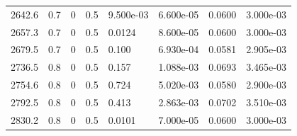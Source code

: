 \documentclass[preview]{standalone}
\begin{document}
{{{\begin{tabular}{L{1.2cm}C{1.2cm} C{0.3cm}C{0.5cm} C{1.4cm}C{1.4cm} C{1.4cm}C{1.4cm}}
  2642.6  &   0.7  & 0     & 0.5 &  9.500e-03  & 6.600e-05  & 0.0600 &  3.000e-03   \\ 
  2657.3  &   0.7  & 0     & 0.5 &  0.0124  & 8.600e-05  & 0.0600 &  3.000e-03   \\ 
  2679.5  &   0.7  & 0     & 0.5 &  0.100  & 6.930e-04  & 0.0581 &  2.905e-03   \\ 
  2736.5  &   0.8  & 0     & 0.5 &  0.157  & 1.088e-03  & 0.0693 &  3.465e-03   \\ 
  2754.6  &   0.8  & 0     & 0.5 &  0.724  & 5.020e-03  & 0.0580 &  2.900e-03   \\ 
  2792.5  &   0.8  & 0     & 0.5 &  0.413  & 2.863e-03  & 0.0702 &  3.510e-03   \\ 
  2830.2  &   0.8  & 0     & 0.5 &  0.0101  & 7.000e-05  & 0.0600 &  3.000e-03   \\ 
\hline 
\end{tabular} 

}}}
\end{document}
